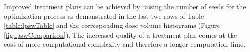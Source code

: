 \documentclass[12pt]{article}
\begin{document}
		Improved treatment plans can be achieved by raising the number of seeds for the optimization process as demonstrated in the last two rows of Table \ref{table:lpswTable} and the corresponding dose volume histograms (Figure \ref{fig:lpswComparison}). The increased quality of a treatment plan comes at the cost of more computational complexity and therefore a longer computation time. 




\end{document}
